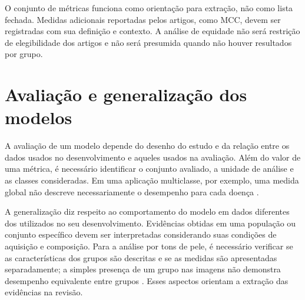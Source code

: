 O conjunto de métricas funciona como orientação para extração, não como
lista fechada. Medidas adicionais reportadas pelos artigos, como MCC,
devem ser registradas com sua definição e contexto. A análise de
equidade não será restrição de elegibilidade dos artigos e não será
presumida quando não houver resultados por grupo.

\section{Avaliação e generalização dos modelos}
\label{sec:avaliacao-generalizacao}

A avaliação de um modelo depende do desenho do estudo e da relação entre
os dados usados no desenvolvimento e aqueles usados na avaliação. Além do
valor de uma métrica, é necessário identificar o conjunto avaliado, a unidade
de análise e as classes consideradas. Em uma aplicação multiclasse, por
exemplo, uma medida global não descreve necessariamente o desempenho para
cada doença \cite{yotsu2023}.

A generalização diz respeito ao comportamento do modelo em dados diferentes
dos utilizados no seu desenvolvimento. Evidências obtidas em uma população
ou conjunto específico devem ser interpretadas considerando suas condições
de aquisição e composição. Para a análise por tons de pele, é necessário
verificar se as características dos grupos são descritas e se as medidas
são apresentadas separadamente; a simples presença de um grupo nas imagens
não demonstra desempenho equivalente entre grupos \cite{eita2025,yotsu2023}.
Esses aspectos orientam a extração das evidências na revisão.
